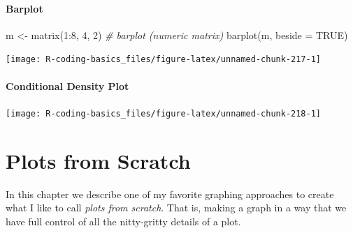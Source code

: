 \documentclass[
]{book}
\newenvironment{Shaded}{\begin{snugshade}}{\end{snugshade}}
\newcommand{\AttributeTok}[1]{\textcolor[rgb]{0.77,0.63,0.00}{#1}}
\newcommand{\CommentTok}[1]{\textcolor[rgb]{0.56,0.35,0.01}{\textit{#1}}}
\newcommand{\ConstantTok}[1]{\textcolor[rgb]{0.00,0.00,0.00}{#1}}
\newcommand{\DecValTok}[1]{\textcolor[rgb]{0.00,0.00,0.81}{#1}}
\newcommand{\FunctionTok}[1]{\textcolor[rgb]{0.00,0.00,0.00}{#1}}
\newcommand{\NormalTok}[1]{#1}
\newcommand{\OtherTok}[1]{\textcolor[rgb]{0.56,0.35,0.01}{#1}}
\newcommand{\SpecialCharTok}[1]{\textcolor[rgb]{0.00,0.00,0.00}{#1}}
\begin{document}
\hypertarget{barplot}{%
\subsubsection*{Barplot}\label{barplot}}

\begin{Shaded}
\begin{Highlighting}[]
\NormalTok{m }\OtherTok{\textless{}{-}} \FunctionTok{matrix}\NormalTok{(}\DecValTok{1}\SpecialCharTok{:}\DecValTok{8}\NormalTok{, }\DecValTok{4}\NormalTok{, }\DecValTok{2}\NormalTok{)}
\CommentTok{\# barplot (numeric matrix)}
\FunctionTok{barplot}\NormalTok{(m, }\AttributeTok{beside =} \ConstantTok{TRUE}\NormalTok{)}
\end{Highlighting}
\end{Shaded}

\begin{center}\texttt{[image: R-coding-basics\_files/figure-latex/unnamed-chunk-217-1]} \end{center}

\hypertarget{conditional-density-plot}{%
\subsubsection*{Conditional Density Plot}\label{conditional-density-plot}}

\begin{Shaded}
\end{Shaded}

\begin{center}\texttt{[image: R-coding-basics\_files/figure-latex/unnamed-chunk-218-1]} \end{center}

\hypertarget{graphics3}{%
\chapter{Plots from Scratch}\label{graphics3}}

In this chapter we describe one of my favorite graphing approaches to create
what I like to call \emph{plots from scratch}. That is, making a graph in a way
that we have full control of all the nitty-gritty details of a plot.
\end{document}
